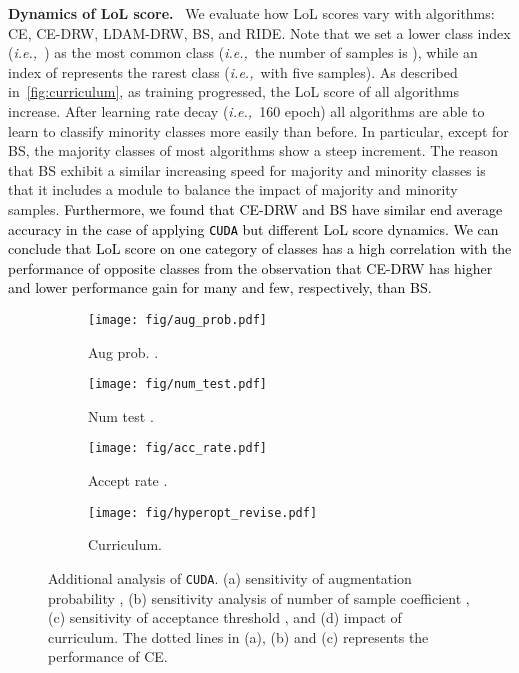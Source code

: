 \documentclass{article}
\newcommand{\ie}{\emph{i.e.,~}}
\newcommand{\myparagraph}[1]{\vspace{0.07cm}\noindent\textbf{#1}~}
\def\code#1{\texttt{#1}}
\newcommand{\alg}{\code{CUDA}\xspace}
\newcommand{\rebut}[1]{\textcolor{black}{#1}}
\begin{document}
\myparagraph{Dynamics of LoL score.}
We evaluate how LoL scores vary with algorithms: CE, CE-DRW, LDAM-DRW, BS, and RIDE. Note that we set a lower class index (\ie ) as the most common class (\ie the number of samples is ), while an index of  represents the rarest class (\ie with five samples). As described in~\autoref{fig:curriculum}, as training progressed, the LoL score of all algorithms increase. After learning rate decay (\ie 160 epoch) all algorithms are able to learn to classify minority classes more easily than before. In particular, except for BS, the majority classes of most algorithms show a steep increment. The reason that BS exhibit a similar increasing speed for majority and minority classes is that it includes a module to balance the impact of majority and minority samples. \rebut{Furthermore, we found that CE-DRW and BS have similar end average accuracy in the case of applying \alg but different LoL score dynamics. We can conclude that LoL score on one category of classes has a high correlation with the performance of opposite classes from the observation that CE-DRW has higher and lower performance gain for many and few, respectively, than BS.} 


\begin{figure}[!t]
    \begin{subfigure}{0.24\linewidth}
            \texttt{[image: fig/aug\_prob.pdf]}
            \vspace{-15pt}
            \caption{Aug prob. .}
            \label{fig:aug_prob}
    \end{subfigure}
    \begin{subfigure}{0.24\linewidth}
            \texttt{[image: fig/num\_test.pdf]}
            \vspace{-15pt}
            \caption{Num test .}
            \label{fig:num_test}
    \end{subfigure}
    \begin{subfigure}{0.24\linewidth}
          \texttt{[image: fig/acc\_rate.pdf]}
          \vspace{-15pt}
            \caption{Accept rate .}
          \label{fig:acc_rate}
    \end{subfigure}
    \begin{subfigure}{0.24\linewidth}
          \texttt{[image: fig/hyperopt\_revise.pdf]}
          \vspace{-15pt}
            \caption{Curriculum.}
          \label{fig:hyper_opt}
    \end{subfigure}
    \vspace{-5pt}
    \caption{Additional analysis of \alg. (a) sensitivity of augmentation probability , (b) sensitivity analysis of number of sample coefficient , (c) sensitivity of acceptance threshold , and (d) impact of curriculum. The dotted lines in (a), (b) and (c) represents the performance of CE.}
    \label{fig:analysis}
    \vspace{-13.5pt}
\end{figure}
\end{document}
